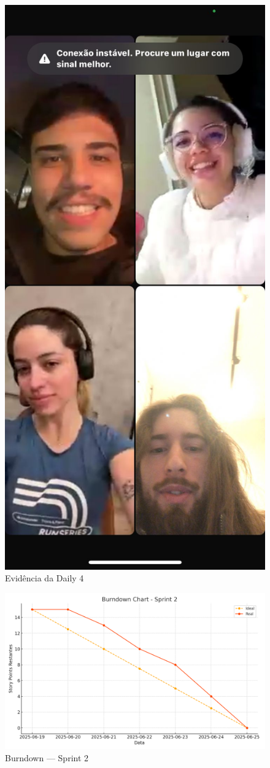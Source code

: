 \begin{figure}[htbp]
  \centering
  \includegraphics[width=0.6\linewidth]{pictures/daily4.png}
  \caption{Evidência da Daily 4}
\end{figure}

\begin{figure}[htbp]
  \centering
  \includegraphics[width=0.7\linewidth]{pictures/burndown_sprint2.png}
  \caption{Burndown — Sprint 2}
\end{figure}



